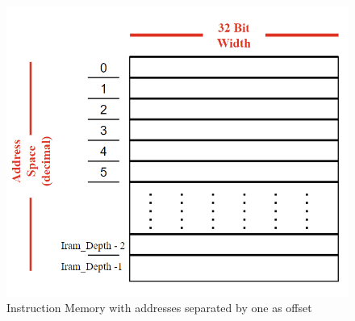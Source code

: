 \begin{figure}[h!]
    \centering
    \includegraphics[scale = 0.45]
    {chapters/figures/IRAM}
    \caption{Instruction Memory with addresses separated by one as offset}
    \label{fig:IRAMpic}
    \end{figure}


